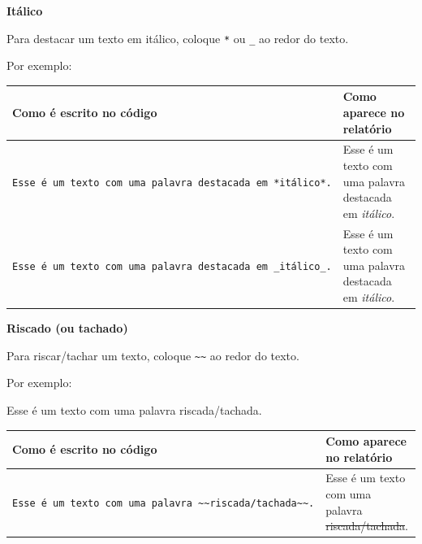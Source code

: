 \documentclass[
]{book}
\begin{document}
\textbf{Itálico}

Para destacar um texto em itálico, coloque \texttt{*} ou \texttt{\_} ao redor do texto.

Por exemplo:

\begin{longtable}[]{@{}
  >{\raggedright\arraybackslash}p{}
  >{\raggedright\arraybackslash}p{}@{}}
\toprule\noalign{}
\begin{minipage}[b]{\linewidth}\raggedright
Como é escrito no código
\end{minipage} & \begin{minipage}[b]{\linewidth}\raggedright
Como aparece no relatório
\end{minipage} \\
\midrule\noalign{}
\endhead
\bottomrule\noalign{}
\endlastfoot
\texttt{Esse\ é\ um\ texto\ com\ uma\ palavra\ destacada\ em\ *itálico*.} & Esse é um texto com uma palavra destacada em \emph{itálico}. \\
\texttt{Esse\ é\ um\ texto\ com\ uma\ palavra\ destacada\ em\ \_itálico\_.} & Esse é um texto com uma palavra destacada em \emph{itálico}. \\
\end{longtable}

\textbf{Riscado (ou tachado)}

Para riscar/tachar um texto, coloque \texttt{\textasciitilde{}\textasciitilde{}} ao redor do texto.

Por exemplo:

Esse é um texto com uma palavra riscada/tachada.

\begin{longtable}[]{@{}
  >{\raggedright\arraybackslash}p{}
  >{\raggedright\arraybackslash}p{}@{}}
\toprule\noalign{}
\begin{minipage}[b]{\linewidth}\raggedright
Como é escrito no código
\end{minipage} & \begin{minipage}[b]{\linewidth}\raggedright
Como aparece no relatório
\end{minipage} \\
\midrule\noalign{}
\endhead
\bottomrule\noalign{}
\endlastfoot
\texttt{Esse\ é\ um\ texto\ com\ uma\ palavra\ \textasciitilde{}\textasciitilde{}riscada/tachada\textasciitilde{}\textasciitilde{}.} & Esse é um texto com uma palavra \st{riscada/tachada}. \\
\end{longtable}
\end{document}

